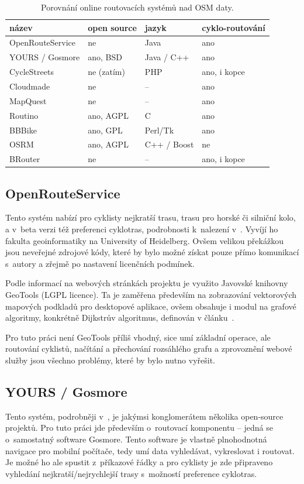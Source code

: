 \documentclass[thesis=B,czech]{FITthesis}[2012/06/26]
\begin{document}
\begin{table}[h!]
\begin{tabular}{l|l|l|l} %
\textbf{název} & \textbf{open source} & \textbf{jazyk} & \textbf{cyklo-routování}  \\
\hline
OpenRouteService   & ne   & Java   & ano    \\
YOURS / Gosmore    & ano, BSD & Java / C++ & ano \\
CycleStreets       & ne (zatím) & PHP & ano, i kopce \\
Cloudmade & ne & -- & ano \\
MapQuest & ne &  -- & ano \\
Routino  &  ano, AGPL &  C & ano \\
BBBike & ano, GPL& Perl/Tk& ano \\
OSRM  &  ano, AGPL & C++ / Boost & ne \\
BRouter & ne & -- & ano, i kopce
\end{tabular}
\caption{Porovnání online routovacích systémů nad OSM daty.}
\label{table:srovnani}
\end{table}



\subsection{OpenRouteService}
Tento systém nabízí pro cyklisty nejkratší trasu, trasu pro horské či silniční kolo,  a v~beta verzi též preferenci cyklotras, podrobnosti k~nalezení v~\cite{openrouteservice}. Vyvíjí ho fakulta geoinformatiky na University of Heidelberg. Ovšem velikou překážkou jsou neveřejné zdrojové kódy, které by bylo možné získat pouze přímo komunikací s~autory a zřejmě po nastavení licenčních podmínek.

Podle informací na webových stránkách projektu je využito Javovské knihovny GeoTools (LGPL licence). Ta je zaměřena především na zobrazování vektorových mapových podkladů pro desktopové aplikace, ovšem obsahuje i modul na grafové algoritmy, konkrétně Dijkstrův algoritmus, definován v článku~\cite{dijkstra}. 

Pro tuto práci není GeoTools příliš vhodný, sice umí základní operace, ale routování cyklistů, načítání a přechování rozsáhlého grafu a zprovoznění webové služby jsou všechno problémy, které by bylo nutno vyřešit.


\subsection{YOURS / Gosmore}
Tento systém, podrobněji v~\cite{yours}, je jakýmsi konglomerátem několika open-source projektů. Pro tuto práci jde především o~routovací komponentu -- jedná se o~samostatný software Gosmore. Tento software je vlastně plnohodnotná navigace pro mobilní počítače, tedy umí data vyhledávat, vykreslovat i routovat. Je možné ho ale spustit z~příkazové řádky a pro cyklisty je zde připraveno vyhledání nejkratší/nejrychlejší trasy s~možností preference cyklotras. 
\end{document}
